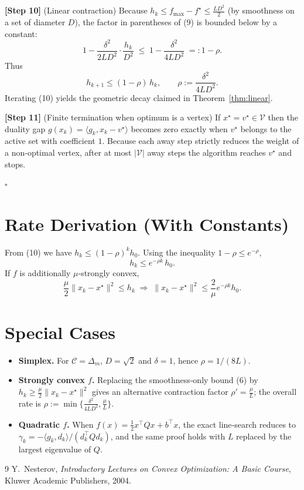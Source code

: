 \documentclass{article}
\begin{document}
\noindent\textbf{[Step 10]} (Linear contraction)  
Because $h_{k}\le f_{\max}-f^{\star}\le \frac{L D^{2}}{2}$ (by smoothness on a set of diameter $D$), the factor in parentheses of (9) is bounded below by a constant:
\[
1-\frac{\delta^{2}}{2L D^{2}}\cdot\frac{h_{k}}{D^{2}}
\;\le\;1-\frac{\delta^{2}}{4L D^{2}}\;=:1-\rho .
\]
Thus
\[
h_{k+1}\le (1-\rho)\,h_{k},\qquad 
\rho:=\frac{\delta^{2}}{4L D^{2}}.
\tag{10}
\]
Iterating (10) yields the geometric decay claimed in Theorem~\ref{thm:linear}.

\noindent\textbf{[Step 11]} (Finite termination when optimum is a vertex)  
If $x^{\star}=v^{\star}\in\mathcal{V}$ then the duality gap $g(x_{k})=\langle g_{k},x_{k}-v^{\star}\rangle$ becomes zero exactly when $v^{\star}$ belongs to the active set with coefficient $1$.  Because each away step strictly reduces the weight of a non‑optimal vertex, after at most $|\mathcal{V}|$ away steps the algorithm reaches $v^{\star}$ and stops.

\hfill $\square$

\section*{Rate Derivation (With Constants)}
From (10) we have $h_{k}\le (1-\rho)^{k}h_{0}$.  
Using the inequality $1-\rho\le e^{-\rho}$,
\[
h_{k}\le e^{-\rho k}\,h_{0}.
\]
If $f$ is additionally $\mu$‑strongly convex,
\[
\frac{\mu}{2}\|x_{k}-x^{\star}\|^{2}\le h_{k}
\;\Longrightarrow\;
\|x_{k}-x^{\star}\|^{2}\le\frac{2}{\mu}e^{-\rho k}h_{0}.
\]

\section*{Special Cases}
\begin{itemize}
\item \textbf{Simplex.} For $\mathcal{C}=\Delta_{m}$, $D=\sqrt{2}$ and $\delta=1$, hence $\rho=1/(8L)$.
\item \textbf{Strongly convex $f$.} Replacing the smoothness‑only bound (6) by $h_{k}\ge \frac{\mu}{2}\|x_{k}-x^{\star}\|^{2}$ gives an alternative contraction factor $\rho'=\frac{\mu}{L}$; the overall rate is $\rho:=\min\{\frac{\delta^{2}}{4L D^{2}},\frac{\mu}{L}\}$.
\item \textbf{Quadratic $f$.} When $f(x)=\frac{1}{2}x^{\top}Qx+b^{\top}x$, the exact line‑search reduces to $\gamma_{k}= -\langle g_{k},d_{k}\rangle/(d_{k}^{\top}Qd_{k})$, and the same proof holds with $L$ replaced by the largest eigenvalue of $Q$.
\end{itemize}

\begin{thebibliography}{9}
Y.~Nesterov, \emph{Introductory Lectures on Convex Optimization: A Basic Course}, Kluwer Academic Publishers, 2004.
\end{thebibliography}
\end{document}
